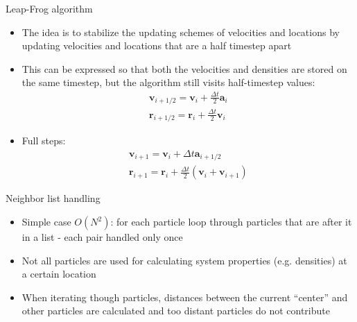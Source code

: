 \documentclass{beamer}
\begin{document}
\begin{frame}{Leap-Frog algorithm}
\begin{itemize}

\item The idea is to stabilize the updating schemes of velocities and locations by updating
velocities and locations that are a half timestep apart
\item This can be expressed so that both the velocities and densities are stored on the same
timestep, but the algorithm still visits half-timestep values:
\begin{eqnarray}
 \mathbf{v}_{i+1/2} = \mathbf{v}_i + \frac{\Delta t}{2} \mathbf{a}_i \\
 \mathbf{r}_{i+1/2} = \mathbf{r}_i + \frac{\Delta t}{2} \mathbf{v}_i
\end{eqnarray}
\item Full steps:
\begin{eqnarray}
\mathbf{v}_{i+1} = \mathbf{v}_i + \Delta t \mathbf{a}_{i+1/2} \\
\mathbf{r}_{i+1} = \mathbf{r}_i + \frac{\Delta t}{2} ( \mathbf{v}_i + \mathbf{v}_{i+1} )
\end{eqnarray}

\end{itemize}
\end{frame}

\begin{frame}{Neighbor list handling}
\begin{itemize}

\item Simple case $O(N^2)$: for each particle loop through particles that are after it in a list -
each pair handled only once
\item Not all particles are used for calculating system properties (e.g. densities) at a certain location
\item When iterating though particles, distances between the current ``center'' and other particles are calculated and too distant particles do not contribute

\end{itemize}
\end{frame}
\end{document}

